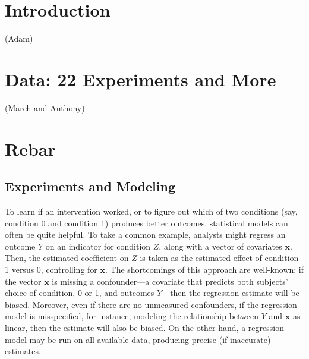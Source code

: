 \documentclass{edm_template}
\begin{document}
\section{Introduction}
(Adam)

\section{Data: 22 Experiments and More}
(March and Anthony)

\section{Rebar}
\subsection{Experiments and Modeling}
To learn if an intervention worked, or to figure out which of two conditions (say, condition 0 and condition 1) produces better outcomes, statistical models can often be quite helpful. 
To take a common example, analysts might regress an outcome $Y$ on an indicator for condition $Z$, along with a vector of covariates $\bm{x}$.
Then, the estimated coefficient on $Z$ is taken as the estimated effect of condition 1 versus 0, controlling for $\bm{x}$. 
The shortcomings of this approach are well-known: if the vector $\bm{x}$ is missing a confounder---a covariate that predicts both subjects' choice of condition, 0 or 1, and outcomes $Y$---then the regression estimate will be biased. 
Moreover, even if there are no unmeasured confounders, if the regression model is misspecified, for instance, modeling the relationship between $Y$ and $\bm{x}$ as linear, then the estimate will also be biased. 
On the other hand, a regression model may be run on all available data, producing precise (if inaccurate) estimates. 
\end{document}

